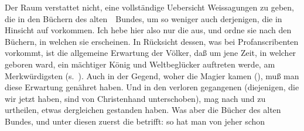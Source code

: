 Der Raum verstattet nicht, eine vollständige Uebersicht  Weissagungen zu geben, die in den Büchern des alten~\ Bundes, um so weniger auch derjenigen, die  in Hinsicht auf  vorkommen. Ich hebe hier also nur die  aus, und ordne sie nach den Büchern, in welchen sie erscheinen. In Rücksicht dessen, was bei Profanscribenten vorkommt, ist die allgemeine Erwartung der Völker, daß um jene Zeit, in welcher  geboren ward, ein mächtiger König und Weltbeglücker auftreten werde, am Merkwürdigsten (s.~). Auch in der Gegend, woher die Magier kamen (), muß man diese Erwartung genähret haben. Und in den verloren gegangenen  (diejenigen, die wir jetzt haben, sind von Christenhand unterschoben), mag nach  und  zu urtheilen, etwas dergleichen gestanden haben. Was aber die Bücher des alten Bundes, und unter diesen zuerst die  betrifft: so hat man von jeher schon
